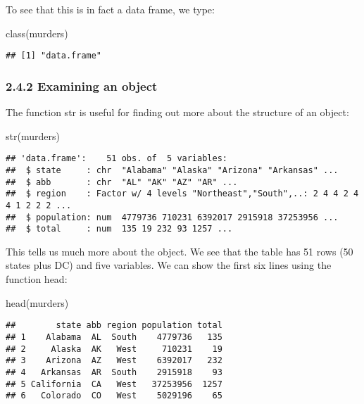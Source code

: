 \documentclass[
]{article}
\newenvironment{Shaded}{\begin{snugshade}}{\end{snugshade}}
\newcommand{\FunctionTok}[1]{\textcolor[rgb]{0.00,0.00,0.00}{#1}}
\newcommand{\NormalTok}[1]{#1}
\begin{document}
To see that this is in fact a data frame, we type:

\begin{Shaded}
\begin{Highlighting}[]
\FunctionTok{class}\NormalTok{(murders)}
\end{Highlighting}
\end{Shaded}

\begin{verbatim}
## [1] "data.frame"
\end{verbatim}

\hypertarget{examining-an-object}{%
\subsubsection{2.4.2 Examining an object}\label{examining-an-object}}

The function str is useful for finding out more about the structure of
an object:

\begin{Shaded}
\begin{Highlighting}[]
\FunctionTok{str}\NormalTok{(murders)}
\end{Highlighting}
\end{Shaded}

\begin{verbatim}
## 'data.frame':    51 obs. of  5 variables:
##  $ state     : chr  "Alabama" "Alaska" "Arizona" "Arkansas" ...
##  $ abb       : chr  "AL" "AK" "AZ" "AR" ...
##  $ region    : Factor w/ 4 levels "Northeast","South",..: 2 4 4 2 4 4 1 2 2 2 ...
##  $ population: num  4779736 710231 6392017 2915918 37253956 ...
##  $ total     : num  135 19 232 93 1257 ...
\end{verbatim}

This tells us much more about the object. We see that the table has 51
rows (50 states plus DC) and five variables. We can show the first six
lines using the function head:

\begin{Shaded}
\begin{Highlighting}[]
\FunctionTok{head}\NormalTok{(murders)}
\end{Highlighting}
\end{Shaded}

\begin{verbatim}
##        state abb region population total
## 1    Alabama  AL  South    4779736   135
## 2     Alaska  AK   West     710231    19
## 3    Arizona  AZ   West    6392017   232
## 4   Arkansas  AR  South    2915918    93
## 5 California  CA   West   37253956  1257
## 6   Colorado  CO   West    5029196    65
\end{verbatim}
\end{document}

